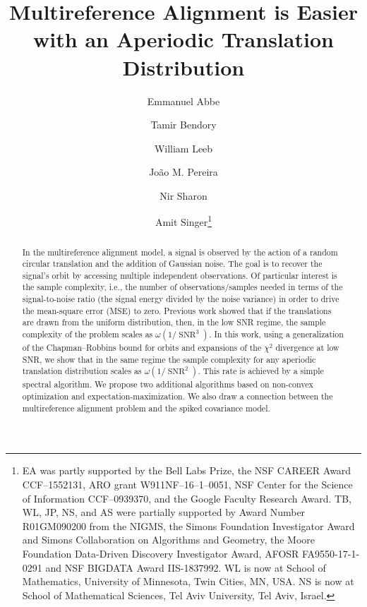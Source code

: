 \documentclass{IEEEtran}
\numberwithin{equation}{section}
\numberwithin{figure}{section}
\theoremstyle{plain}
\theoremstyle{definition}
\theoremstyle{remark}
\theoremstyle{plain}
\theoremstyle{remark}
\theoremstyle{plain}
\theoremstyle{plain}
\theoremstyle{remark}
\newcommand{\SNR}{\operatorname{SNR}}
\begin{document}
 

\title{Multireference Alignment is Easier with an Aperiodic Translation Distribution}

\author[1,2]{Emmanuel Abbe}
\author[1]{Tamir Bendory}
\author[1]{William Leeb}
\author[1]{Jo\~ao M. Pereira}
\author[1]{Nir Sharon}
\author[1,3]{Amit Singer\thanks{
	EA was partly supported by the Bell Labs Prize, the NSF CAREER Award CCF--1552131, ARO grant W911NF--16--1--0051, NSF Center for the Science of Information CCF--0939370, and the Google Faculty Research Award. TB, WL, JP, NS, and AS were partially supported by Award Number R01GM090200 from the NIGMS, the Simons Foundation Investigator Award and Simons Collaboration on Algorithms and Geometry, the Moore Foundation Data-Driven Discovery Investigator Award, AFOSR FA9550-17-1-0291 and NSF BIGDATA Award IIS-1837992. WL is now at School of Mathematics, University of Minnesota, Twin Cities, MN, USA. NS is now at School of Mathematical Sciences, Tel Aviv University, Tel Aviv, Israel.
}}
 


\maketitle


\begin{abstract}
In the multireference alignment model, a signal is observed by the action of a random circular translation and the addition of Gaussian noise. The goal is to recover the signal's orbit by accessing multiple independent observations. Of particular interest is the sample complexity, i.e., the number of observations/samples needed in terms of the signal-to-noise ratio (the signal energy divided by the noise variance) in order to drive the mean-square error (MSE) to zero.
Previous work showed that if the translations are drawn from the uniform distribution, then, in the low SNR regime, the sample complexity of the problem scales as $\omega(1/\SNR^3)$. In this work, using a generalization of the Chapman--Robbins bound for orbits and expansions of the $\chi^2$ divergence at low SNR, we show that in the same regime the sample complexity for any aperiodic translation distribution scales as $\omega(1/\SNR^2)$. This rate is achieved by a simple spectral algorithm. We propose two additional algorithms based on non-convex optimization and expectation-maximization. We also draw a connection between the multireference alignment problem and the spiked covariance model.
\end{abstract}
\end{document}
